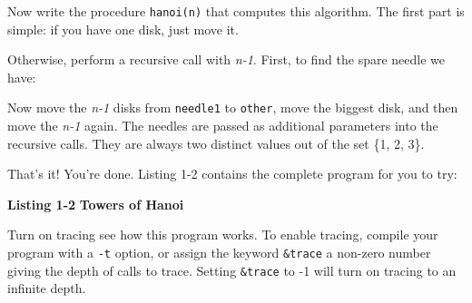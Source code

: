 Now write the procedure \texttt{hanoi(n)} that computes this algorithm.
The first part is simple: if you have one disk, just move it.


\noindent
Otherwise, perform a recursive call with \textit{n-1}. First, to find
the spare needle we have:


Now move the \textit{n-1} disks from \texttt{needle1} to \texttt{other},
move the biggest disk, and then move the \textit{n-1} again. The
needles are passed as additional parameters into the recursive calls.
They are always two distinct values out of the set \{1, 2, 3\}.


\noindent
That's it! You're done. Listing
1-2 contains the complete program for you to try:

\bigskip

{\sffamily\bfseries Listing 1-2}
{\sffamily\bfseries Towers of Hanoi}


\noindent
Turn on tracing see how this program works.
To enable tracing, compile your program with a
\texttt{{}-t} option, or assign the keyword \texttt{\&trace} a non-zero
number giving the depth of calls to trace. Setting \texttt{\&trace} to
-1 will turn on tracing to an infinite depth.

